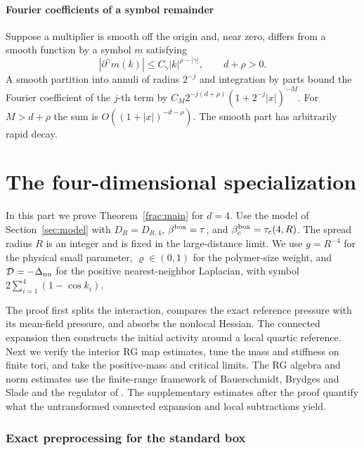 \documentclass[11pt]{article}
\begin{document}
\subsection{Fourier coefficients of a symbol remainder}
\label{sec:fourier-remainder}

Suppose a multiplier is smooth off the origin and, near
zero, differs from a smooth function by a symbol \(m\) satisfying
\[
 |\partial^\gamma m(k)|\le C_\gamma |k|^{\rho-|\gamma|},
 \qquad d+\rho>0.
\]
A smooth partition into annuli of radius \(2^{-j}\) and integration
by parts bound the Fourier coefficient of the \(j\)-th term by
\(C_M2^{-j(d+\rho)}(1+2^{-j}|x|)^{-M}\). For \(M>d+\rho\) the sum
is \(O((1+|x|)^{-d-\rho})\). The smooth part has arbitrarily rapid
decay.

\clearpage
\part{The four-dimensional specialization}\label{part:fourdim}

In this part we prove Theorem~\ref{frac:main} for \(d=4\).
Use the model of Section~\ref{sec:model} with
\(D_R=D_{R,4}\), \(\beta^{\rm box}=\tau\), and
\(\beta_c^{\rm box}=\tau_c(4,R)\). The spread radius \(R\)
is an integer and is fixed in the large-distance limit. We use
\(g=R^{-4}\) for the physical small parameter, \(\varrho\in(0,1)\)
for the polymer-size weight, and \(\mathcal D=-\Delta_{\rm nn}\)
for the positive nearest-neighbor Laplacian, with symbol
\(2\sum_{i=1}^4(1-\cos k_i)\).

The proof first splits the interaction, compares the exact reference
pressure with its mean-field pressure, and absorbs the nonlocal
Hessian. The connected expansion then constructs the initial
activity around a local quartic reference. Next we verify the
interior RG map estimates, tune the mass and stiffness on finite
tori, and take the positive-mass and critical limits. The RG algebra
and norm estimates use the finite-range framework of Bauerschmidt,
Brydges and Slade and the regulator of \cite{ParkMap,ParkTorus}.
The supplementary estimates after the proof quantify what the
untransformed connected expansion and local subtractions yield.

\section{Exact preprocessing for the standard box}\label{sec:box-preprocessing}
\end{document}
